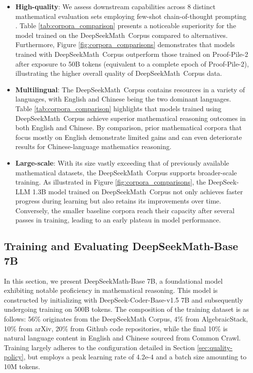 \begin{itemize}[topsep=0pt]
\begin{itemize}[topsep=0pt]
    \item \textbf{High-quality}:
    We assess downstream capabilities across 8 distinct mathematical evaluation sets employing few-shot chain-of-thought prompting \cite{cot}. Table \ref{tab:corpora_comparison} presents a noticeable superiority for the model trained on the DeepSeekMath~Corpus compared to alternatives. Furthermore, Figure \ref{fig:corpora_comparisons} demonstrates that models trained with DeepSeekMath~Corpus outperform those trained on Proof-Pile-2 after exposure to 50B tokens (equivalent to a complete epoch of Proof-Pile-2), illustrating the higher overall quality of DeepSeekMath~Corpus data. 
    \item \textbf{Multilingual}:
    The DeepSeekMath~Corpus contains resources in a variety of languages, with English and Chinese being the two dominant languages. Table \ref{tab:corpora_comparison} highlights that models trained using DeepSeekMath~Corpus achieve superior mathematical reasoning outcomes in both English and Chinese. By comparison, prior mathematical corpora that focus mostly on English demonstrate limited gains and can even deteriorate results for Chinese-language mathematics reasoning.
    \item \textbf{Large-scale}:
    With its size vastly exceeding that of previously available mathematical datasets, the DeepSeekMath~Corpus supports broader-scale training. As illustrated in Figure \ref{fig:corpora_comparisons}, the DeepSeek-LLM 1.3B model trained on DeepSeekMath~Corpus not only achieves faster progress during learning but also retains its improvements over time. Conversely, the smaller baseline corpora reach their capacity after several passes in training, leading to an early plateau in model performance.
\end{itemize}

\subsection{Training and Evaluating DeepSeekMath-Base 7B}

In this section, we present DeepSeekMath-Base 7B, a foundational model exhibiting notable proficiency in mathematical reasoning. This model is constructed by initializing with DeepSeek-Coder-Base-v1.5 7B \citep{deepseek-coder} and subsequently undergoing training on 500B tokens. The composition of the training dataset is as follows: 56\% originates from the DeepSeekMath Corpus, 4\% from AlgebraicStack, 10\% from arXiv, 20\% from Github code repositories, while the final 10\% is natural language content in English and Chinese sourced from Common Crawl. Training largely adheres to the configuration detailed in Section \ref{sec:quality-policy}, but employs a peak learning rate of 4.2e-4 and a batch size amounting to 10M tokens.


\end{itemize}
